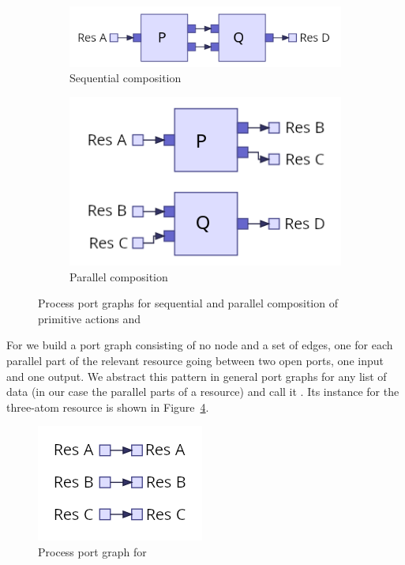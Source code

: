 \documentclass[class=smolathesis,crop=false]{standalone}
\begin{document}
\begin{figure}[htbp]
  \begin{subfigure}{0.45\textwidth}
    \centering
    \includegraphics[scale=0.4]{img/seq_port_graph.png}
    \caption{Sequential composition}
    \label{fig:seq_port_graph}
  \end{subfigure}
  \begin{subfigure}{0.45\textwidth}
    \centering
    \includegraphics[scale=0.4]{img/par_port_graph.png}
    \caption{Parallel composition}
    \label{fig:par_port_graph}
  \end{subfigure}
  \caption{Process port graphs for sequential and parallel composition of primitive actions  and }
  \label{fig:seq_par_port_graph}
\end{figure}

For  we build a port graph consisting of no node and a set of edges, one for each parallel part of the relevant resource going between two open ports, one input and one output.
We abstract this pattern in general port graphs for any list of data (in our case the parallel parts of a resource) and call it .
Its instance for the three-atom resource  is shown in Figure~\ref{fig:id_port_graph}.

\begin{figure}[htbp]
  \centering
  \includegraphics[scale=0.5]{img/id_port_graph.png}
  \caption{Process port graph for }
  \label{fig:id_port_graph}
\end{figure}
\end{document}
